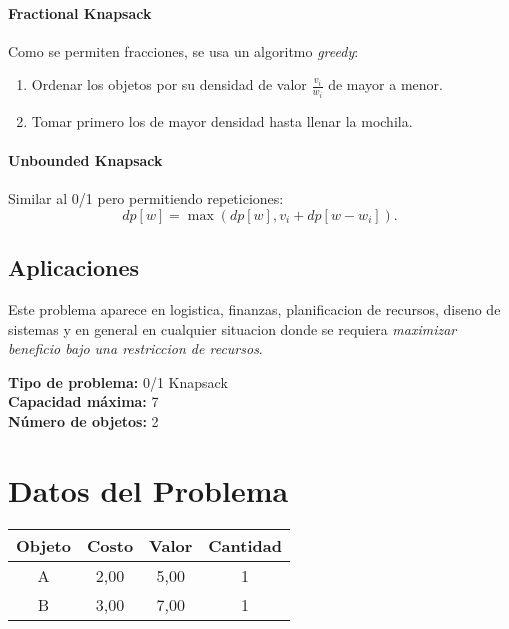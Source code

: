 \documentclass{article}
\begin{document}
\paragraph{Fractional Knapsack} Como se permiten fracciones, se usa un algoritmo \textit{greedy}:
\begin{enumerate}
  \item Ordenar los objetos por su densidad de valor $\frac{v_i}{w_i}$ de mayor a menor.
  \item Tomar primero los de mayor densidad hasta llenar la mochila.
\end{enumerate}

\paragraph{Unbounded Knapsack} Similar al 0/1 pero permitiendo repeticiones:
\[
dp[w] = \max ( dp[w], v_i + dp[w - w_i] ).
\]

\subsection{Aplicaciones}
Este problema aparece en logistica, finanzas, planificacion de recursos, diseno de sistemas y en general en cualquier situacion donde se requiera \textit{maximizar beneficio bajo una restriccion de recursos}.

\thispagestyle{empty}
\newpage
\textbf{Tipo de problema:} 0/1 Knapsack\\
\textbf{Capacidad máxima:} 7\\
\textbf{Número de objetos:} 2\\

\clearpage
\section*{Datos del Problema}
\begin{tabular}{|c|c|c|c|}
\hline
Objeto & Costo & Valor & Cantidad \\
\hline
A & 2,00 & 5,00 & 1 \\
B & 3,00 & 7,00 & 1 \\
\hline
\end{tabular}
\end{document}
